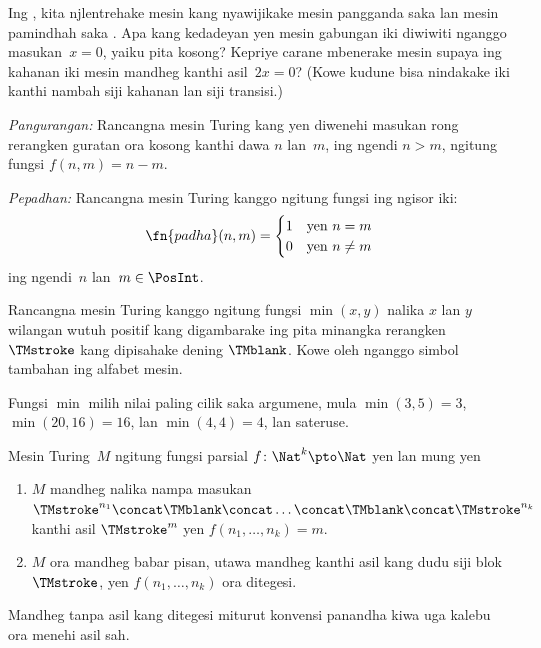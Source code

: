 \documentclass[../../../include/open-logic-section]{subfiles}
\begin{document}
\begin{prob}
Ing , kita njlentrehake
mesin kang nyawijikake mesin pangganda saka
 lan mesin
pamindhah saka .
Apa kang kedadeyan yen mesin gabungan iki
diwiwiti nganggo masukan~$x=0$, yaiku pita kosong?
Kepriye carane mbenerake mesin supaya ing kahanan
iki mesin mandheg kanthi asil~$2x=0$?
(Kowe kudune bisa nindakake iki kanthi nambah
siji kahanan lan siji transisi.)
\end{prob}

\begin{prob}
\emph{Pangurangan:} Rancangna mesin Turing kang
yen diwenehi masukan rong rerangken guratan ora kosong
kanthi dawa $n$ lan~$m$, ing ngendi $n >
m$, ngitung fungsi $f(n,m) = n - m$.
\end{prob}

\begin{prob}
\emph{Pepadhan:} Rancangna mesin Turing kanggo
ngitung fungsi ing ngisor iki:
\[
\fn{padha}(n,m) = 
\begin{cases}
  \text{1} & \text{yen~$n = m$} \\
  \text{0} & \text{yen~$n \neq m$}
\end{cases}
\]
ing ngendi~$n$ lan~$m \in \PosInt$.
\end{prob}

\begin{prob}
Rancangna mesin Turing kanggo ngitung fungsi
$\min(x,y)$ nalika $x$ lan $y$ wilangan wutuh
positif kang digambarake ing pita minangka
rerangken $\TMstroke$ kang dipisahake dening
$\TMblank$. Kowe oleh nganggo simbol tambahan
ing alfabet mesin.

Fungsi $\min$ milih nilai paling cilik saka
argumene, mula $\min(3,5)=3$, $\min(20,16)=16$,
lan $\min(4,4)=4$, lan sateruse.
\end{prob}

\begin{defn}
  Mesin Turing~$M$ ngitung fungsi parsial $f\colon \Nat^k
  \pto \Nat$ yen lan mung yen
  \begin{enumerate}
    \item $M$ mandheg nalika nampa masukan $\TMstroke^{n_1}\concat\TMblank\concat
    \dots \concat\TMblank\concat\TMstroke^{n_k}$ kanthi asil $\TMstroke^{m}$ yen $f(n_1, \dots, n_k) = m$.
    \item $M$ ora mandheg babar pisan, utawa mandheg kanthi
    asil kang dudu siji blok~$\TMstroke$, yen
    $f(n_1, \dots, n_k)$ ora ditegesi.
  \end{enumerate}
Mandheg tanpa asil kang ditegesi miturut konvensi panandha kiwa uga kalebu ora menehi asil sah.
\end{defn}
\end{document}

